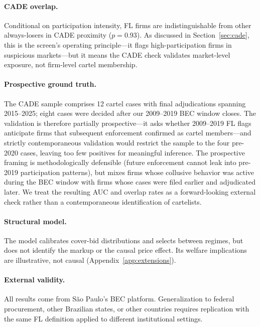 \paragraph{CADE overlap.}
Conditional on participation intensity, FL firms are indistinguishable
from other always-losers in CADE proximity ($p = 0.93$). As discussed
in Section~\ref{sec:cade}, this is the screen's operating
principle---it flags high-participation firms in suspicious
markets---but it means the CADE check validates market-level exposure,
not firm-level cartel membership.

\paragraph{Prospective ground truth.}
The CADE sample comprises 12 cartel cases with final adjudications
spanning 2015--2025; eight cases were decided after our 2009--2019
BEC window closes. The validation is therefore partially
prospective---it asks whether 2009--2019 FL flags anticipate firms
that subsequent enforcement confirmed as cartel members---and
strictly contemporaneous validation would restrict the sample to
the four pre-2020 cases, leaving too few positives for meaningful
inference. The prospective framing is methodologically defensible
(future enforcement cannot leak into pre-2019 participation
patterns), but mixes firms whose collusive behavior was active
during the BEC window with firms whose cases were filed earlier
and adjudicated later. We treat the resulting AUC and overlap
rates as a forward-looking external check rather than a
contemporaneous identification of cartelists.

\paragraph{Structural model.}
The model calibrates cover-bid distributions and selects between
regimes, but does not identify the markup or the causal price effect.
Its welfare implications are illustrative, not causal
(Appendix~\ref{app:extensions}).

\paragraph{External validity.}
All results come from S\~ao Paulo's BEC platform. Generalization to
federal procurement, other Brazilian states, or other countries
requires replication with the same FL definition applied to different
institutional settings.
